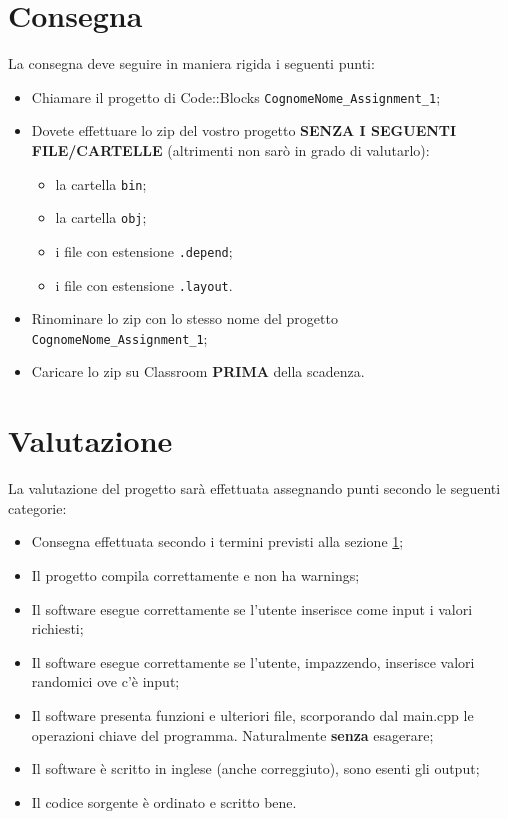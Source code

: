 \documentclass[addpoints]{exam}
\begin{document}
    \section{Consegna}
    \label{consegna}
    La consegna deve seguire in maniera rigida i seguenti punti:
    \begin{itemize}
        \item Chiamare il progetto di Code::Blocks \texttt{CognomeNome\_Assignment\_1};
        \item Dovete effettuare lo zip del vostro progetto \textbf{SENZA I SEGUENTI FILE/CARTELLE} (altrimenti non sarò in grado di valutarlo): 
        \begin{itemize}
            \item la cartella \texttt{bin};
            \item la cartella \texttt{obj};
            \item i file con estensione \texttt{.depend};
            \item i file con estensione \texttt{.layout}.
        \end{itemize}
        \item Rinominare lo zip con lo stesso nome del progetto \texttt{CognomeNome\_Assignment\_1};
        \item Caricare lo zip su Classroom \textbf{PRIMA} della scadenza.
    \end{itemize}

    \clearpage
    
    \section{Valutazione}
    La valutazione del progetto sarà effettuata assegnando punti secondo le seguenti categorie:
    \begin{itemize}
        \item Consegna effettuata secondo i termini previsti alla sezione \ref{consegna};
        \item Il progetto compila correttamente e non ha warnings;
        \item Il software esegue correttamente se l'utente inserisce come input i valori richiesti;
        \item Il software esegue correttamente se l'utente, impazzendo, inserisce valori randomici ove c'è input;
        \item Il software presenta funzioni e ulteriori file, scorporando dal main.cpp le operazioni chiave del programma. Naturalmente \textbf{senza} esagerare;
        \item Il software è scritto in inglese (anche correggiuto), sono esenti gli output;
        \item Il codice sorgente è ordinato e scritto bene.
    \end{itemize}
\end{document}
